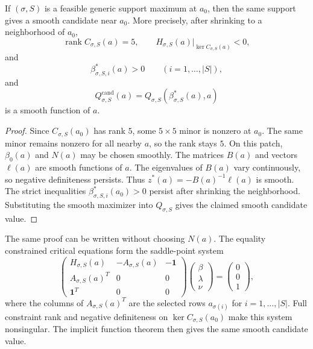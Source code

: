 \begin{unverified}
\begin{lemma}
\label{lem:feasible-generic-support-maxima-smooth}
If \((\sigma,S)\) is a feasible generic support maximum at \(a_0\), then the
same support gives a smooth candidate near \(a_0\). More precisely, after
shrinking to a neighborhood of \(a_0\),
\[
  \operatorname{rank} C_{\sigma,S}(a)=5,\qquad
  H_{\sigma,S}(a)|_{\ker C_{\sigma,S}(a)} < 0,
\]
and
\[
  \beta^*_{\sigma,S,i}(a)>0
  \qquad (i=1,\ldots,|S|),
\]
and
\[
  Q^{\mathrm{cand}}_{\sigma,S}(a)
    = Q_{\sigma,S}(\beta^*_{\sigma,S}(a),a)
\]
is a smooth function of \(a\).
\end{lemma}

\begin{proof}
Since \(C_{\sigma,S}(a_0)\) has rank \(5\), some \(5\times 5\) minor is
nonzero at \(a_0\). The same minor remains nonzero for all nearby \(a\), so
the rank stays \(5\). On this patch, \(\beta_0(a)\) and \(N(a)\) may be chosen
smoothly. The matrices \(B(a)\) and vectors \(\ell(a)\) are smooth functions
of \(a\). The eigenvalues of \(B(a)\) vary continuously, so negative
definiteness persists. Thus \(z^*(a)=-B(a)^{-1}\ell(a)\) is smooth. The
strict inequalities \(\beta^*_{\sigma,S,i}(a_0)>0\) persist after shrinking
the neighborhood. Substituting the smooth maximizer into \(Q_{\sigma,S}\)
gives the claimed smooth candidate value.
\end{proof}

\begin{remark}
\label{rem:generic-feasible-kkt-form}
The same proof can be written without choosing \(N(a)\). The equality
constrained critical equations form the saddle-point system
\[
  \begin{pmatrix}
    H_{\sigma,S}(a) & -A_{\sigma,S}(a) & -\mathbf{1} \\
    A_{\sigma,S}(a)^T & 0 & 0 \\
    \mathbf{1}^T & 0 & 0
  \end{pmatrix}
  \begin{pmatrix}
    \beta \\ \lambda \\ \nu
  \end{pmatrix}
  =
  \begin{pmatrix}
    0 \\ 0 \\ 1
\end{pmatrix},
\]
where the columns of \(A_{\sigma,S}(a)^T\) are the selected rows
\(a_{\sigma(i)}\) for \(i=1,\ldots,|S|\). Full constraint rank and negative
definiteness on
\(\ker C_{\sigma,S}(a_0)\) make this system nonsingular. The implicit function
theorem then gives the same smooth candidate value.
\end{remark}


\end{unverified}
